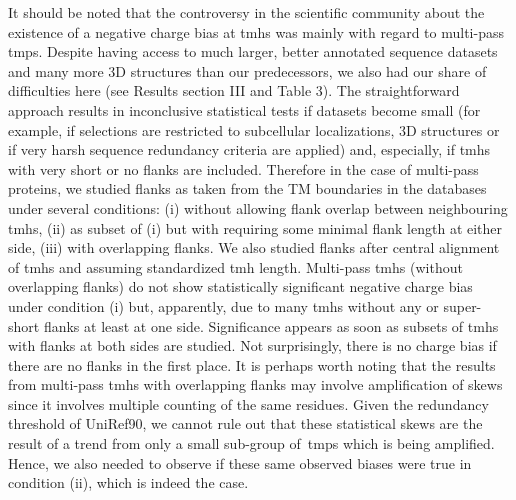 It should be noted that the controversy in the scientific community about the existence of a negative charge bias at \gls{tmh}s was mainly with regard to multi-pass \gls{tmp}s.
Despite having access to much larger, better annotated sequence datasets and many more 3D structures than our predecessors, we also had our share of difficulties here (see Results section III and Table 3).
The straightforward approach results in inconclusive statistical tests if datasets become small (for example, if selections are restricted to subcellular localizations, 3D structures or if very harsh sequence redundancy criteria are applied) and, especially, if \gls{tmh}s with very short or no flanks are included.
Therefore in the case of multi-pass proteins, we studied flanks as taken from the TM boundaries in the databases under several conditions: (i) without allowing flank overlap between neighbouring \gls{tmh}s, (ii) as subset of (i) but with requiring some minimal flank length at either side, (iii) with overlapping flanks.
We also studied flanks after central alignment of \gls{tmh}s and assuming standardized \gls{tmh} length.
Multi-pass \gls{tmh}s (without overlapping flanks) do not show statistically significant negative charge bias under condition (i) but, apparently, due to many \gls{tmh}s without any or super-short flanks at least at one side.
Significance appears as soon as subsets of \gls{tmh}s with flanks at both sides are studied.
Not surprisingly, there is no charge bias if there are no flanks in the first place.
It is perhaps worth noting that the results from multi-pass \gls{tmh}s with overlapping flanks may involve amplification of skews since it involves multiple counting of the same residues.
Given the redundancy threshold of UniRef90, we cannot rule out that these statistical skews are the result of a trend from only a small sub-group of~\gls{tmp}s which is being amplified.
Hence, we also needed to observe if these same observed biases were true in condition (ii), which is indeed the case.

